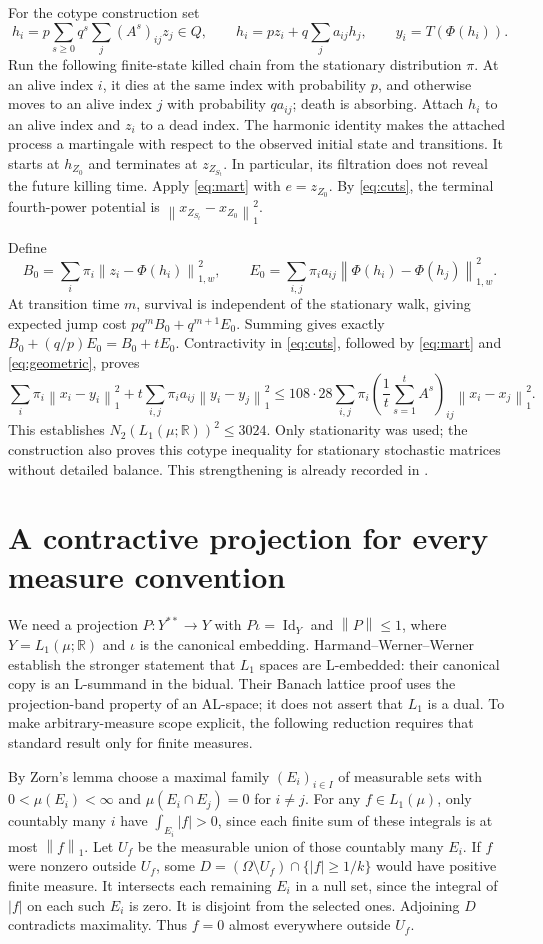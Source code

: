 \documentclass[11pt]{article}
\newcommand{\R}{\mathbb R}
\newcommand{\norm}[1]{\left\lVert#1\right\rVert}
\newcommand{\1}{\mathbf1}
\begin{document}
For the cotype construction set
\[
 h_i=p\sum_{s\geq0}q^s\sum_j(A^s)_{ij}z_j\in Q,
 \qquad h_i=pz_i+q\sum_j a_{ij}h_j,
 \qquad y_i=T(\Phi(h_i)).
\]
Run the following finite-state killed chain from the stationary distribution $\pi$. At an alive index $i$, it dies at the same index with probability $p$, and otherwise moves to an alive index $j$ with probability $qa_{ij}$; death is absorbing. Attach $h_i$ to an alive index and $z_i$ to a dead index. The harmonic identity makes the attached process a martingale with respect to the observed initial state and transitions. It starts at $h_{Z_0}$ and terminates at $z_{Z_{S_t}}$. In particular, its filtration does not reveal the future killing time. Apply \eqref{eq:mart} with $e=z_{Z_0}$. By \eqref{eq:cuts}, the terminal fourth-power potential is $\norm{x_{Z_{S_t}}-x_{Z_0}}_1^2$.

Define
\[
 B_0=\sum_i\pi_i\norm{z_i-\Phi(h_i)}_{1,w}^2,\qquad
 E_0=\sum_{i,j}\pi_i a_{ij}\norm{\Phi(h_i)-\Phi(h_j)}_{1,w}^2.
\]
At transition time $m$, survival is independent of the stationary walk, giving expected jump cost $pq^mB_0+q^{m+1}E_0$. Summing gives exactly $B_0+(q/p)E_0=B_0+tE_0$. Contractivity in \eqref{eq:cuts}, followed by \eqref{eq:mart} and \eqref{eq:geometric}, proves
\[
 \sum_i\pi_i\norm{x_i-y_i}_1^2+t\sum_{i,j}\pi_i a_{ij}\norm{y_i-y_j}_1^2
 \leq108\cdot28\sum_{i,j}\pi_i\left(\frac1t\sum_{s=1}^tA^s\right)_{ij}\norm{x_i-x_j}_1^2.
\]
This establishes $N_2(L_1(\mu;\R))^2\leq3024$. Only stationarity was used; the construction also proves this cotype inequality for stationary stochastic matrices without detailed balance. This strengthening is already recorded in \cite{OAI332}.

\section{A contractive projection for every measure convention}\label{sec:projection}
We need a projection $P:Y^{**}\to Y$ with $P\iota=\operatorname{Id}_Y$ and $\norm P\leq1$, where $Y=L_1(\mu;\R)$ and $\iota$ is the canonical embedding. Harmand--Werner--Werner \cite[Chapter IV, Example 1.1(a), p.158]{HWW} establish the stronger statement that $L_1$ spaces are L-embedded: their canonical copy is an L-summand in the bidual. Their Banach lattice proof uses the projection-band property of an AL-space; it does not assert that $L_1$ is a dual. To make arbitrary-measure scope explicit, the following reduction requires that standard result only for finite measures.

By Zorn's lemma choose a maximal family $(E_i)_{i\in I}$ of measurable sets with $0<\mu(E_i)<\infty$ and $\mu(E_i\cap E_j)=0$ for $i\ne j$. For any $f\in L_1(\mu)$, only countably many $i$ have $\int_{E_i}|f|>0$, since each finite sum of these integrals is at most $\norm f_1$. Let $U_f$ be the measurable union of those countably many $E_i$. If $f$ were nonzero outside $U_f$, some $D=(\Omega\setminus U_f)\cap\{|f|\geq1/k\}$ would have positive finite measure. It intersects each remaining $E_i$ in a null set, since the integral of $|f|$ on each such $E_i$ is zero. It is disjoint from the selected ones. Adjoining $D$ contradicts maximality. Thus $f=0$ almost everywhere outside $U_f$.
\end{document}
